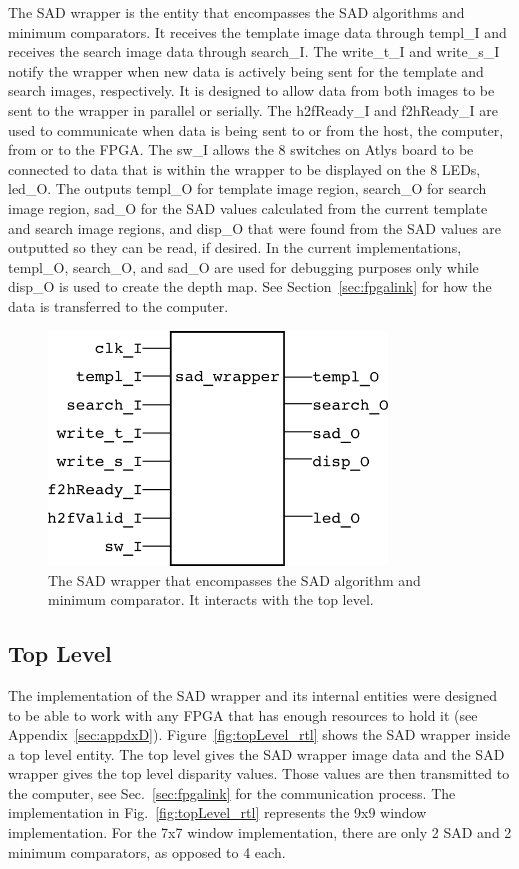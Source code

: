 The SAD wrapper is the entity that encompasses the SAD algorithms and minimum comparators. It receives the template image data through templ\_I and receives the search image data through search\_I. The write\_t\_I and write\_s\_I notify the wrapper when new data is actively being sent for the template and search images, respectively. It is designed to allow data from both images to be sent to the wrapper in parallel or serially. The h2fReady\_I and f2hReady\_I are used to communicate when data is being sent to or from the host, the computer, from or to the FPGA. The sw\_I allows the 8 switches on Atlys board to be connected to data that is within the wrapper to be displayed on the 8 LEDs, led\_O. The outputs templ\_O for template image region, search\_O for search image region, sad\_O for the SAD values calculated from the current template and search image regions, and disp\_O that were found from the SAD values are outputted so they can be read, if desired. In the current implementations, templ\_O, search\_O, and sad\_O are used for debugging purposes only while disp\_O is used to create the depth map. See Section~\ref{sec:fpgalink} for how the data is transferred to the computer.

\begin{figure}[h]
	\begin{center}
		\includegraphics[width=90mm]{figures/sad_wrapper_rtl.png}
		\captionfonts
		\caption{The SAD wrapper that encompasses the SAD algorithm and minimum comparator. It interacts with the top level.}
		\label{fig:sadWrapper_rtl}
	\end{center}
\end{figure}

\subsection{Top Level}

The implementation of the SAD wrapper and its internal entities were designed to be able to work with any FPGA that has enough resources to hold it (see Appendix~\ref{sec:appdxD}). Figure~\ref{fig:topLevel_rtl} shows the SAD wrapper inside a top level entity. The top level gives the SAD wrapper image data and the SAD wrapper gives the top level disparity values. Those values are then transmitted to the computer, see Sec.~\ref{sec:fpgalink} for the communication process. The implementation in Fig.~\ref{fig:topLevel_rtl} represents the 9x9 window implementation. For the 7x7 window implementation, there are only 2 SAD and 2 minimum comparators, as opposed to 4 each.

